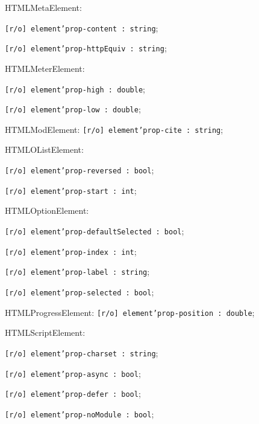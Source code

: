 \begin{icItems}
	\item HTMLMetaElement:
	\begin{icItems}
		\item \texttt{[r/o] element'prop-content : string};
		\item \texttt{[r/o] element'prop-httpEquiv : string};
	\end{icItems}
	
	\item HTMLMeterElement:
	\begin{icItems}
		\item \texttt{[r/o] element'prop-high : double};
		\item \texttt{[r/o] element'prop-low : double};
	\end{icItems}
	
	\item HTMLModElement: \texttt{[r/o] element'prop-cite : string};
	
	\item HTMLOListElement:
	\begin{icItems}
		\item \texttt{[r/o] element'prop-reversed : bool};
		\item \texttt{[r/o] element'prop-start : int};
	\end{icItems}
	
	\item HTMLOptionElement:
	\begin{icItems}
		\item \texttt{[r/o] element'prop-defaultSelected : bool};
		\item \texttt{[r/o] element'prop-index : int};
		\item \texttt{[r/o] element'prop-label : string};
		\item \texttt{[r/o] element'prop-selected : bool};
	\end{icItems}
	
	\item HTMLProgressElement: \texttt{[r/o] element'prop-position : double};
	
	\item HTMLScriptElement:
	\begin{icItems}
		\item \texttt{[r/o] element'prop-charset : string};
		\item \texttt{[r/o] element'prop-async : bool};
		\item \texttt{[r/o] element'prop-defer : bool};
		\item \texttt{[r/o] element'prop-noModule : bool};
	\end{icItems}
	

\end{icItems}
